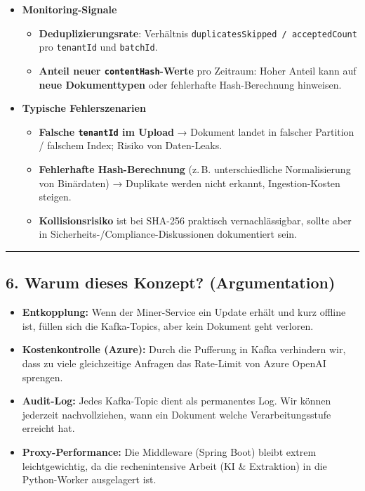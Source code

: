 \begin{itemize}
\tightlist
\item
  \textbf{Monitoring-Signale}

  \begin{itemize}
  \tightlist
  \item
    \textbf{Deduplizierungsrate}: Verhältnis
    \texttt{duplicatesSkipped\ /\ acceptedCount} pro \texttt{tenantId}
    und \texttt{batchId}.\\
  \item
    \textbf{Anteil neuer \texttt{contentHash}-Werte} pro Zeitraum: Hoher
    Anteil kann auf \textbf{neue Dokumenttypen} oder fehlerhafte
    Hash-Berechnung hinweisen.
  \end{itemize}
\item
  \textbf{Typische Fehlerszenarien}

  \begin{itemize}
  \tightlist
  \item
    \textbf{Falsche \texttt{tenantId} im Upload} → Dokument landet in
    falscher Partition / falschem Index; Risiko von Daten-Leaks.\\
  \item
    \textbf{Fehlerhafte Hash-Berechnung} (z.\,B. unterschiedliche
    Normalisierung von Binärdaten) → Duplikate werden nicht erkannt,
    Ingestion-Kosten steigen.\\
  \item
    \textbf{Kollisionsrisiko} ist bei SHA-256 praktisch
    vernachlässigbar, sollte aber in
    Sicherheits-/Compliance-Diskussionen dokumentiert sein.
  \end{itemize}
\end{itemize}

\begin{center}\rule{0.5\linewidth}{0.5pt}\end{center}

\subsection{6. Warum dieses Konzept?
(Argumentation)}\label{warum-dieses-konzept-argumentation}

\begin{itemize}
\tightlist
\item
  \textbf{Entkopplung:} Wenn der Miner-Service ein Update erhält und
  kurz offline ist, füllen sich die Kafka-Topics, aber kein Dokument
  geht verloren.
\item
  \textbf{Kostenkontrolle (Azure):} Durch die Pufferung in Kafka
  verhindern wir, dass zu viele gleichzeitige Anfragen das Rate-Limit
  von Azure OpenAI sprengen.
\item
  \textbf{Audit-Log:} Jedes Kafka-Topic dient als permanentes Log. Wir
  können jederzeit nachvollziehen, wann ein Dokument welche
  Verarbeitungsstufe erreicht hat.
\item
  \textbf{Proxy-Performance:} Die Middleware (Spring Boot) bleibt extrem
  leichtgewichtig, da die rechenintensive Arbeit (KI \& Extraktion) in
  die Python-Worker ausgelagert ist.
\end{itemize}

